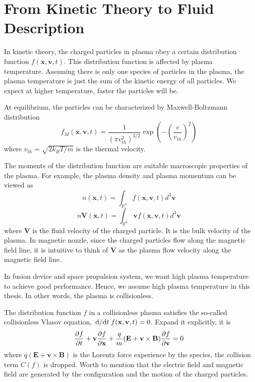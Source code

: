 \section{From Kinetic Theory to Fluid Description}
In kinetic theory, the charged particles in plasma obey a certain distribution function $f(\mathbf{x}, \mathbf{v}, t)$. This distribution function is affected by plasma temperature. Assuming there is only one species of particles in the plasma, the plasma temperature is just the sum of the kinetic energy of all particles. We expect at higher temperature, faster the particles will be.

At equilibrium, the particles can be characterized by Maxwell-Boltzmann distribution
\[ f_M(\mathbf{x}, \mathbf{v}, t) = \frac{1}{(\pi v_{th}^2)^{3/2}} \exp(-\left(\frac{v}{v_{th}}\right)^2) \]
where $v_{th} = \sqrt{2k_BT/m}$ is the thermal velocity.

The moments of the distribution function are suitable macroscopic properties of the plasma. For example, the plasma density and plasma momentum can be viewed as 
\[ n(\mathbf{x}, t) = \int_{\mathbb{R}^3} f(\mathbf{x}, \mathbf{v}, t) d^3\mathbf{v} \]
\[ n\mathbf{V}(\mathbf{x}, t) = \int_{\mathbb{R}^3} \mathbf{v}f(\mathbf{x}, \mathbf{v}, t) d^3\mathbf{v} \]
where $\mathbf{V}$ is the fluid velocity of the charged particle. It is the bulk velocity of the plasma. In magnetic nozzle, since the charged particles flow along the magnetic field line, it is intuitive to think of $\mathbf{V}$ as the plasma flow velocity along the magnetic field line.

In fusion device and space propulsion system, we want high plasma temperature to achieve good performance. Hence, we assume high plasma temperature in this thesis. In other words, the plasma is collisionless. 

The distribution function $f$ in a collisionless plasma satisfies the so-called collisionless Vlasov equation, $\dv*{t} f(\mathbf{x}, \mathbf{v}, t) = 0$. Expand it explicitly, it is
\begin{equation} \label{eq:vlasov}
	\pdv{f}{t} + \mathbf{v}\pdv{f}{\mathbf{x}} + \frac{q}{m}(\mathbf{E} + \mathbf{v}\times\mathbf{B})\pdv{f}{\mathbf{v}} = 0
\end{equation}
where $q(\mathbf{E} + \mathbf{v}\times\mathbf{B})$ is the Lorentz force experience by the species, the collision term $C(f)$ is dropped. Worth to mention that the electric field and magnetic field are generated by the configuration and the motion of the charged particles.

